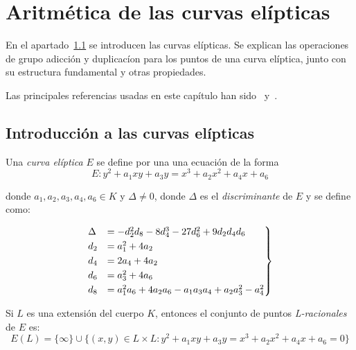 \chapter{Aritmética de las curvas elípticas}
\label{ch:Aritmética de las curvas elípticas}


En el apartado~\ref{sec:Introducción} se introducen las curvas elípticas. Se explican las operaciones de grupo adicción y duplicacíon para los puntos de una curva elíptica, junto con su estructura fundamental y otras propiedades.

Las principales referencias usadas en este capítulo han sido~\cite{Washington:2008} y~\cite{Hankerson:2003}.


\section{Introducción a las curvas elípticas}
\label{sec:Introducción}

\begin{definicion}
\label{def:curva elíptica}
	Una \emph{curva elíptica} $E$ se define por una una ecuación de la forma
	\begin{equation}
	\label{eq:Weierstrass general}
		E : y^2 + a_1 x y + a_3 y = x^3 + a_2 x^2 + a_4 x + a_6
	\end{equation}

	donde $a_1, a_2, a_3, a_4, a_6 \in K$ y $\Delta \neq 0$, donde $\Delta$ es el \emph{discriminante} de $E$ y se define como:

	\begin{align}
		\label{eq:discriminante}
		\begin{rcases}
		\Delta & = -d_2^2 d_8 - 8 d_4^3 - 27 d_6^2 + 9 d_2 d_4 d_6         \\
		d_2    & = a_1^2 + 4 a_ 2                                          \\
		d_4    & = 2 a_4 + 4 a_2                                           \\
		d_6    & = a_3^2 + 4 a_6                                           \\
		d_8    & = a_1^2 a_6 + 4 a_2 a_6 - a_1 a_3 a_4 + a_2 a_3^2 - a_4^2 \\
		\end{rcases}
	\end{align}

	Si $L$ es una extensión del cuerpo $K$, entonces el conjunto de puntos \emph{L-racionales} de $E$ es:
	$$
	E(L) = \{\infty\} \cup \{(x, y) \in L \times L: y^2 + a_1 x y + a_3 y = x^3 + a_2 x^2 + a_4 x + a_6 = 0\}
	$$
\end{definicion}

